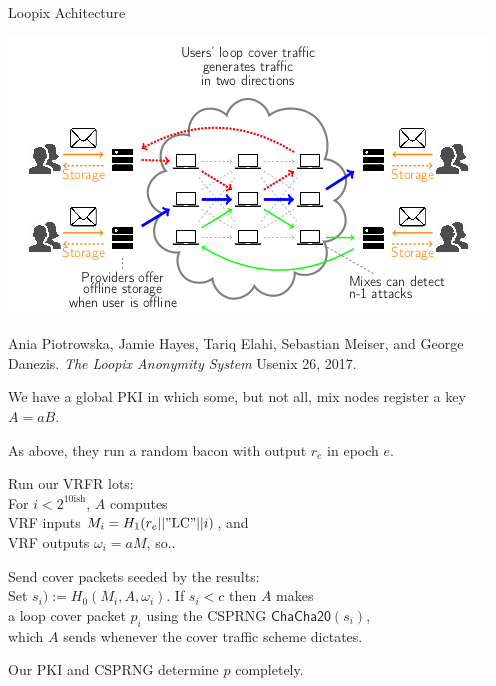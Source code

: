 \documentclass[fleqn,xcolor={usenames,dvipsnames},notes,aspectratio=169]{beamer} %
\begin{document}
\begin{frame}{Loopix Achitecture}
\begin{center}
\includegraphics[trim=0 0 0 50,clip,width=\textwidth]{../pics/loopix/achitecture}
\end{center}

\hspace*{3pt} Ania Piotrowska, Jamie Hayes, Tariq Elahi, Sebastian Meiser, and
\hspace*{3pt} George Danezis. {\em The Loopix Anonymity System} Usenix 26, 2017.

\end{frame}


\begin{frame}

We have a global PKI in which some, but not all, mix nodes
 register a key $A = a B$.

\smallskip

As above, they run a random bacon with output $r_e$ in epoch $e$.

\pause\bigskip\medskip

Run our VRFR lots: \\ \hspace*{3pt} 
For $i < 2^{10\mathrm{ish}}$, $A$ computes \\ \hspace*{3pt} 
 VRF inputs $M_i = H_1(r_e || \mathrm{"LC"} || i)$, and \\ \hspace*{3pt} 
 VRF outputs $\omega_i = a M$, so..\\ 

\bigskip

Send cover packets seeded by the results: \\ \hspace*{3pt} 
Set $s_i) := H_0(M_i, A, \omega_i)$. 
If $s_i< c$ then $A$ makes \\ \hspace*{3pt} 
 a loop cover packet $p_i$ using the CSPRNG $\mathsf{ChaCha20}(s_i)$, \\ \hspace*{3pt} 
 which $A$ sends whenever the cover traffic scheme dictates.

\bigskip

Our PKI and CSPRNG determine $p$ completely.

\end{frame}
\end{document}
